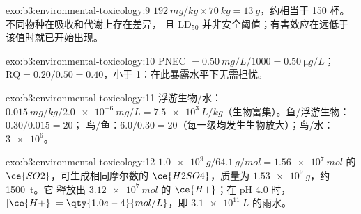 \begin{solution}{exo:b3:environmental-toxicology:9}
$\qty{192}{mg/kg} \times \qty{70}{kg} = \qty{13}{g}$，约相当于 150 杯。不同物种在吸收和代谢上存在差异，
且 $\mathrm{LD_{50}}$ 并非安全阈值；有害效应在远低于该值时就已开始出现。
\end{solution}

\begin{solution}{exo:b3:environmental-toxicology:10}
PNEC $= \qty{0.50}{mg/L}/1000 = \qty{0.50}{\micro g/L}$；$\mathrm{RQ} = 0.20/0.50 = 0.40$，小于 1：在此暴露水平下无需担忧。
\end{solution}

\begin{solution}{exo:b3:environmental-toxicology:11}
浮游生物/水：$\qty{0.015}{mg/kg}/\qty{2.0e-6}{mg/L} = \qty{7.5e3}{L/kg}$（生物富集）。鱼/浮游生物：$0.30/0.015 = 20$；
鸟/鱼：$6.0/0.30 = 20$（每一级均发生生物放大）；鸟/水：$\num{3e6}$。
\end{solution}

\begin{solution}{exo:b3:environmental-toxicology:12}
$\qty{1.0e9}{g}/\qty{64.1}{g/mol} = \qty{1.56e7}{mol}$ 的 $\ce{SO2}$，可生成相同摩尔数的 $\ce{H2SO4}$，质量为 $\qty{1.53e9}{g}$，约 \qty{1500}{t}。它
释放出 $\qty{3.12e7}{mol}$ 的 $\ce{H+}$；在 pH 4.0 时，$[\ce{H+}] = \qty{1.0e-4}{mol/L}$，即 $\qty{3.1e11}{L}$ 的雨水。
\end{solution}

